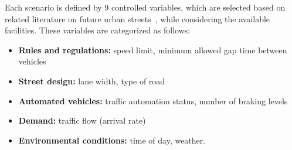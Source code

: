 Each scenario is defined by 9 controlled variables, which are selected based on related literature on future urban streets~\citep{kinaSUR}, while considering the available facilities. These variables are categorized as follows: 
\begin{itemize} 
\item \textbf{Rules and regulations:} speed limit, minimum allowed gap time between vehicles 
\item \textbf{Street design:} lane width, type of road 
\item \textbf{Automated vehicles:} traffic automation status, number of braking levels
\item \textbf{Demand:} traffic flow (arrival rate)
\item \textbf{Environmental conditions:} time of day, weather.
\end{itemize}
